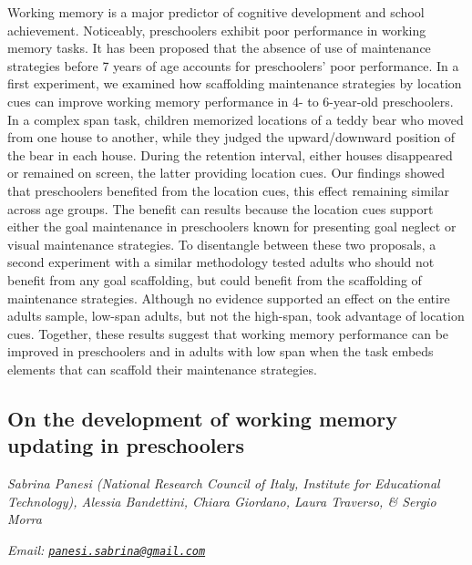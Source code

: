 \documentclass[12pt,]{book}
\begin{document}
Working memory is a major predictor of cognitive development and school achievement. Noticeably, preschoolers exhibit poor performance in working memory tasks. It has been proposed that the absence of use of maintenance strategies before 7 years of age accounts for preschoolers' poor performance. In a first experiment, we examined how scaffolding maintenance strategies by location cues can improve working memory performance in 4- to 6-year-old preschoolers. In a complex span task, children memorized locations of a teddy bear who moved from one house to another, while they judged the upward/downward position of the bear in each house. During the retention interval, either houses disappeared or remained on screen, the latter providing location cues. Our findings showed that preschoolers benefited from the location cues, this effect remaining similar across age groups. The benefit can results because the location cues support either the goal maintenance in preschoolers known for presenting goal neglect or visual maintenance strategies. To disentangle between these two proposals, a second experiment with a similar methodology tested adults who should not benefit from any goal scaffolding, but could benefit from the scaffolding of maintenance strategies. Although no evidence supported an effect on the entire adults sample, low-span adults, but not the high-span, took advantage of location cues. Together, these results suggest that working memory performance can be improved in preschoolers and in adults with low span when the task embeds elements that can scaffold their maintenance strategies.

\hypertarget{on-the-development-of-working-memory-updating-in-preschoolers}{%
\subsection{On the development of working memory updating in preschoolers}\label{on-the-development-of-working-memory-updating-in-preschoolers}}

\emph{Sabrina Panesi (National Research Council of Italy, Institute for Educational Technology), Alessia Bandettini, Chiara Giordano, Laura Traverso, \& Sergio Morra}

\emph{Email: \href{mailto:panesi.sabrina@gmail.com}{\nolinkurl{panesi.sabrina@gmail.com}}}
\end{document}
